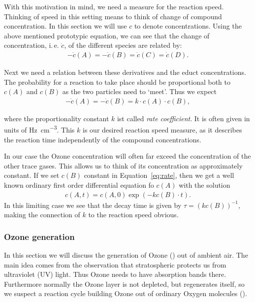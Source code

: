With this motivation in mind, we need a measure for the reaction
speed. Thinking of speed in this setting means to think of change of
compound concentration. In this section we will use $c$ to denote
concentrations. Using the above mentioned prototypic equation, we can
see that the change of concentration, i.\,e. $\dot c$, of the
different species are related by:
\begin{align*}
  -\dot c(A) = - \dot c(B) = \dot c(C) = \dot c(D).
\end{align*}

Next we need a relation between these derivatives and the educt
concentrations. The probability for a reaction to take place should be
proportional both to $c(A)$ and $c(B)$ as the two particles need to
`meet'. Thus we expect
\begin{align}
  -\dot c(A) = - \dot c(B) = k \cdot c(A) \cdot c(B), \label{eq:rate}
\end{align}

where the proportionality constant $k$ ist called \emph{rate
  coefficient}. It is often given in units of
\si{\hertz\per\cubic\centi\meter}. This $k$ is our desired reaction
speed measure, as it describes the
reaction time independently of the compound concentrations.

In our case the Ozone concentration will often far exceed the
concentration of the other trace gases. This allows us to think of its
concentration as approximately constant. If we set $c(B)$ constant in
Equation~\eqref{eq:rate}, then we get a well known ordinary first
order differential equation fo $c(A)$ with the solution
\begin{align*}
  c(A,t) = c(A,0)\exp(-kc(B)\cdot t).
\end{align*}
In this limiting case we see that the decay time is given by $\tau =
(kc(B))^{-1}$, making the connection of $k$ to the reaction speed
obvious.

\subsubsection{Ozone generation}
\label{sec:theory-ozone}

In this section we will discuss the generation of Ozone () out of ambient
air. The main idea comes from the observation that stratospheric
 protects us from ultraviolet (UV) light. Thus Ozone needs to
have absorption bands there. Furthermore normally the Ozone layer is
not depleted, but regenerates itself, so we suspect a reaction
cycle building Ozone out of ordinary Oxygen molecules ().

